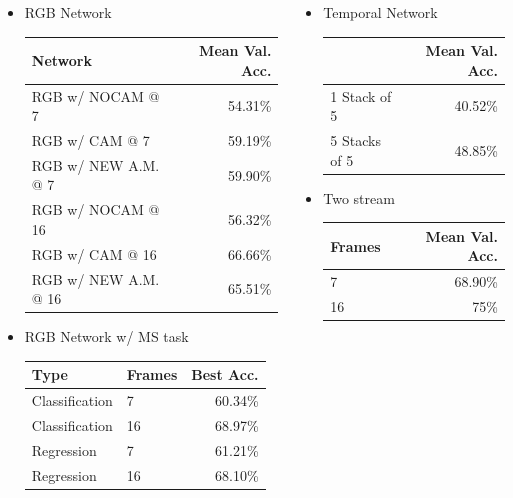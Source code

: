 \documentclass{beamer}
\begin{document}
\begin{frame}
	{ \footnotesize 
	\begin{columns}[c]
		\begin{column}{.65\textwidth}
			\begin{itemize}
				\item RGB Network \\
				\vspace*{8pt}
				\begin{tabular}{l|r}
					Network & Mean Val. Acc. \\
					\hline
					RGB w/ NOCAM @ 7 & 54.31\% \\
					RGB w/ CAM @ 7 & 59.19\% \\
					RGB w/ NEW A.M. @ 7 & 59.90\% \\
					\hline
					RGB w/ NOCAM @ 16 & 56.32\% \\
					RGB w/ CAM @ 16 & 66.66\% \\
					RGB w/ NEW A.M. @ 16 & 65.51\% \\
				\end{tabular}
			\item RGB Network w/ MS task \\
			\vspace*{8pt}
			\begin{tabular}{ll|r}
				Type & Frames & Best Acc. \\
				\hline
				Classification & 7 & 60.34\% \\
				Classification & 16 & 68.97\% \\
				Regression & 7 & 61.21\% \\
				Regression & 16 & 68.10\% \\
			\end{tabular}
			\end{itemize}
		\end{column}
		\begin{column}{.7\textwidth}
				\begin{itemize}
					\item Temporal Network \\
					\vspace*{8pt}
					\begin{tabular}{l|r}
						& Mean Val. Acc. \\
						\hline
						1 Stack of 5 & 40.52\% \\
						5 Stacks of 5 & 48.85\% \\
					\end{tabular}
				\item Two stream \\
				\vspace*{8pt}
				\begin{tabular}{l|r}
					Frames & Mean Val. Acc. \\
					\hline
					7 & 68.90\% \\
					16 & 75\%
				\end{tabular}
				\end{itemize}
			\end{column}
	\end{columns}
	}

\end{frame}
\end{document}
